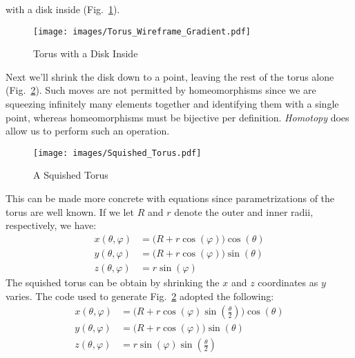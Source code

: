 \documentclass{book}                                                           %
\begin{document}
                with a disk inside (Fig.~\ref{fig:Torus_with_Disc_Inside}).
                \begin{figure}[H]
                    \centering
                    \captionsetup{type=figure}
                    \texttt{[image: images/Torus\_Wireframe\_Gradient.pdf]}
                    \caption{Torus with a Disk Inside}
                    \label{fig:Torus_with_Disc_Inside}
                \end{figure}
                Next we'll shrink the disk down to a point, leaving the rest of
                the torus alone (Fig.~\ref{fig:Squished_Torus}). Such moves are
                not permitted by homeomorphisms since we are squeezing
                infinitely many elements together and identifying them with a
                single point, whereas homeomorphisms must be bijective per
                definition.
                \textit{Homotopy} does allow us to perform such an operation.
                \begin{figure}[H]
                    \centering
                    \captionsetup{type=figure}
                    \texttt{[image: images/Squished\_Torus.pdf]}
                    \caption{A Squished Torus}
                    \label{fig:Squished_Torus}
                \end{figure}
                This can be made more concrete with equations since
                parametrizations of the torus are well known. If we let $R$ and
                $r$ denote the outer and inner radii, respectively, we have:
                \begin{subequations}
                    \begin{align}
                        x(\theta,\varphi)
                            &=\big(R+r\cos(\varphi)\big)\cos(\theta)\\
                        y(\theta,\varphi)
                            &=\big(R+r\cos(\varphi)\big)\sin(\theta)\\
                        z(\theta,\varphi)&=r\sin(\varphi)
                    \end{align}
                \end{subequations}
                The squished torus can be obtain by shrinking the $x$ and $z$
                coordinates as $y$ varies. The code used to generate
                Fig.~\ref{fig:Squished_Torus} adopted the following:
                \begin{subequations}
                    \begin{align}
                        x(\theta,\varphi)
                            &=\big(R+r\cos(\varphi)\sin(\tfrac{\theta}{2})\big)
                                \cos(\theta)\\
                        y(\theta,\varphi)
                            &=\big(R+r\cos(\varphi)\big)\sin(\theta)\\
                        z(\theta,\varphi)
                            &=r\sin(\varphi)\sin(\tfrac{\theta}{2})
                    \end{align}
                \end{subequations}
\end{document}
